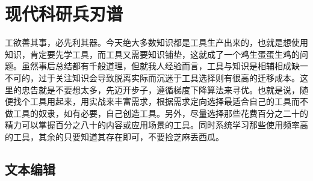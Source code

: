 \documentclass[]{tufte-book}
\begin{document}
\hypertarget{ux73b0ux4ee3ux79d1ux7814ux5175ux5203ux8c31}{%
\section*{现代科研兵刃谱}\label{ux73b0ux4ee3ux79d1ux7814ux5175ux5203ux8c31}}

工欲善其事，必先利其器。今天绝大多数知识都是工具生产出来的，也就是想使用知识，肯定要先学工具，而工具又需要知识铺垫，这就成了一个鸡生蛋蛋生鸡的问题。虽然事后总结都有千般道理，但就我人经验而言，工具与知识是相辅相成缺一不可的，过于关注知识会导致脱离实际而沉迷于工具选择则有很高的迁移成本。这里的忠告就是不要想太多，先迈开步子，遵循梯度下降算法来寻优。也就是说，随便找个工具用起来，用实战来丰富需求，根据需求定向选择最适合自己的工具而不做工具的奴隶，如有必要，自己创造工具。另外，尽量选择那些花费百分之二十的精力可以掌握百分之八十的内容或应用场景的工具。同时系统学习那些使用频率高的工具，其余的只要知道其存在即可，不要捡芝麻丢西瓜。

\hypertarget{ux6587ux672cux7f16ux8f91}{%
\subsection*{文本编辑}\label{ux6587ux672cux7f16ux8f91}}
\end{document}
